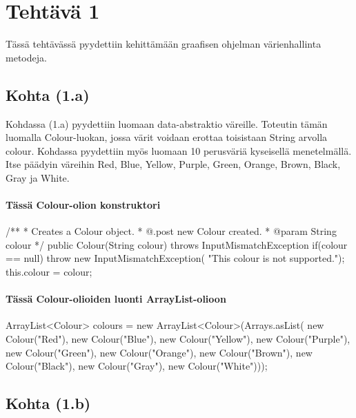 
\chapter{Tehtävä 1 \label{chap:Teht=0000E4v=0000E4-1}}

Tässä tehtävässä pyydettiin kehittämään graafisen ohjelman värienhallinta metodeja.

\section{Kohta (1.a)}

\label{Kohta (1.a)}

Kohdassa (1.a) pyydettiin luomaan data-abstraktio väreille. Toteutin tämän luomalla Colour-luokan, jossa värit voidaan erottaa toisistaan String arvolla colour. Kohdassa pyydettiin myös luomaan 10 perusväriä kyseisellä menetelmällä. Itse päädyin väreihin Red, Blue, Yellow, Purple, Green, Orange, Brown, Black, Gray ja White.

\subsubsection{Tässä Colour-olion konstruktori}

\label{Tässä Colour-olion konstruktori}
\begin{javacode}
/**
 * Creates a Colour object.
 * @.post new Colour created.
 * @param String colour
 */
public Colour(String colour) throws InputMismatchException{
	if(colour == null) {
		throw new InputMismatchException(
		"This colour is not supported.");
	}
	this.colour = colour;
}
\end{javacode}

\subsubsection{Tässä Colour-olioiden luonti ArrayList-olioon}

\label{Tässä Colour-olioiden luonti ArrayList-olioon}
\begin{javacode}
ArrayList<Colour> colours = new ArrayList<Colour>(Arrays.asList(
	new Colour("Red"), new Colour("Blue"), new Colour("Yellow"),
	new Colour("Purple"), new Colour("Green"),
	new Colour("Orange"), new Colour("Brown"),
	new Colour("Black"), new Colour("Gray"),
	new Colour("White")));
\end{javacode}

\section{Kohta (1.b)}

